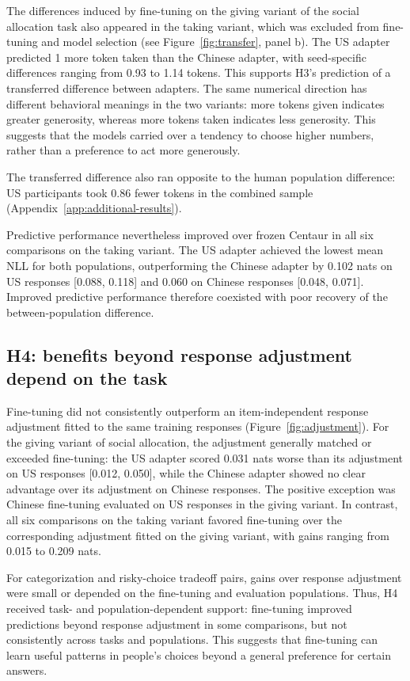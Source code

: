 The differences induced by fine-tuning on the giving variant of the social allocation task also appeared in the taking variant, which was excluded from fine-tuning and model selection (see Figure~\ref{fig:transfer}, panel b). The US adapter predicted 1 more token taken than the Chinese adapter, with seed-specific differences ranging from 0.93 to 1.14 tokens. This supports H3's prediction of a transferred difference between adapters. The same numerical direction has different behavioral meanings in the two variants: more tokens given indicates greater generosity, whereas more tokens taken indicates less generosity. This suggests that the models carried over a tendency to choose higher numbers, rather than a preference to act more generously.

The transferred difference also ran opposite to the human population difference: US participants took 0.86 fewer tokens in the combined sample (Appendix~\ref{app:additional-results}).

Predictive performance nevertheless improved over frozen Centaur in all six comparisons on the taking variant. The US adapter achieved the lowest mean NLL for both populations, outperforming the Chinese adapter by 0.102 nats on US responses [0.088, 0.118] and 0.060 on Chinese responses [0.048, 0.071]. Improved predictive performance therefore coexisted with poor recovery of the between-population difference.



\subsection{H4: benefits beyond response adjustment depend on the task}

Fine-tuning did not consistently outperform an item-independent response adjustment fitted to the same training responses (Figure~\ref{fig:adjustment}). For the giving variant of social allocation, the adjustment generally matched or exceeded fine-tuning: the US adapter scored 0.031 nats worse than its adjustment on US responses [0.012, 0.050], while the Chinese adapter showed no clear advantage over its adjustment on Chinese responses. The positive exception was Chinese fine-tuning evaluated on US responses in the giving variant. In contrast, all six comparisons on the taking variant favored fine-tuning over the corresponding adjustment fitted on the giving variant, with gains ranging from 0.015 to 0.209 nats.

For categorization and risky-choice tradeoff pairs, gains over response adjustment were small or depended on the fine-tuning and evaluation populations. Thus, H4 received task- and population-dependent support: fine-tuning improved predictions beyond response adjustment in some comparisons, but not consistently across tasks and populations. This suggests that fine-tuning can learn useful patterns in people’s choices beyond a general preference for certain answers.

